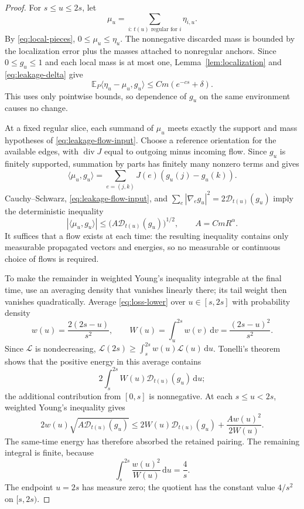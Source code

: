 \begin{proof}
For $s\le u\le2s$, let
\[
 \mu_u=\sum_{i:\,t(u)\text{ regular for }i}\eta_{i,u}.
\]
By \eqref{eq:local-pieces}, $0\le\mu_u\le\eta_u$.
The nonnegative discarded mass is bounded by the localization error
plus the masses attached to nonregular anchors.  Since $0\le g_u\le1$
and each local mass is at most one, Lemma~\ref{lem:localization} and
\eqref{eq:leakage-delta} give
\begin{equation}\label{eq:discarded-pairing}
 \mathbb E_P\langle\eta_u-\mu_u,g_u\rangle
                         \le C m(e^{-cs}+\delta).
\end{equation}
This uses only pointwise bounds, so dependence of $g_u$ on the same
environment causes no change.

At a fixed regular slice, each summand of $\mu_u$ meets exactly the
support and mass hypotheses of \eqref{eq:leakage-flow-input}.  Choose
a reference orientation for the available edges, with
$\operatorname{div}J$ equal to outgoing minus incoming flow.  Since
$g_u$ is finitely supported, summation by parts has finitely many
nonzero terms and gives
\[
 \langle\mu_u,g_u\rangle
   =\sum_{e=(j,k)}J(e)(g_u(j)-g_u(k)).
\]
Cauchy--Schwarz, \eqref{eq:leakage-flow-input}, and
$\sum_e|\nabla_e g_u|^2=2\mathcal D_{t(u)}(g_u)$ imply the
deterministic inequality
\begin{equation}\label{eq:same-time-pairing}
       |\langle\mu_u,g_u\rangle|
          \le\bigl(A\mathcal D_{t(u)}(g_u)\bigr)^{1/2},
               \qquad A=C m R^\alpha.
\end{equation}
It suffices that a flow exists at each time: the resulting inequality
contains only measurable propagated vectors and energies, so no
measurable or continuous choice of flows is required.

To make the remainder in weighted Young's inequality integrable at the
final time, use an averaging density that vanishes linearly there; its
tail weight then vanishes quadratically.
Average \eqref{eq:loss-lower} over $u\in[s,2s]$ with probability
density
\[
 w(u)=\frac{2(2s-u)}{s^2},\qquad
 W(u)=\int_u^{2s}w(v)\,\mathrm dv=\frac{(2s-u)^2}{s^2}.
\]
Since $\mathcal L$ is nondecreasing,
$\mathcal L(2s)\ge\int_s^{2s}w(u)\mathcal L(u)\,\mathrm du$.
Tonelli's theorem shows that the positive energy in this average
contains
\[
                  2\int_s^{2s}W(u)\mathcal D_{t(u)}(g_u)\,\mathrm du;
\]
the additional contribution from $[0,s]$ is nonnegative.
At each $s\le u<2s$, weighted Young's inequality gives
\begin{equation}\label{eq:weighted-young}
 2w(u)\sqrt{A\mathcal D_{t(u)}(g_u)}
 \le2W(u)\mathcal D_{t(u)}(g_u)+\frac{A w(u)^2}{2W(u)}.
\end{equation}
The same-time energy has therefore absorbed the retained pairing.
The remaining integral is finite, because
\begin{equation}\label{eq:weight-integral}
                \int_s^{2s}\frac{w(u)^2}{W(u)}\,\mathrm du=\frac4s.
\end{equation}
The endpoint $u=2s$ has measure zero; the quotient has the constant
value $4/s^2$ on $[s,2s)$.


\end{proof}
